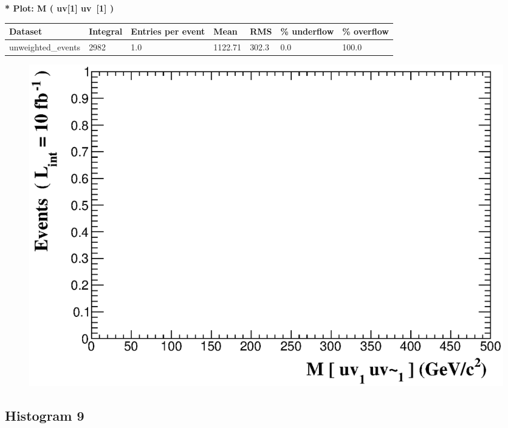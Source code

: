 \documentclass[a4paper, 10pt]{article}
\begin{document}
\textbf{* Plot: M ( uv[1] uv~[1] ) }\\
   \begin{table}[H]
  \begin{center}
    \begin{tabular}{|m{23.0mm}|m{23.0mm}|m{18.0mm}|m{19.0mm}|m{19.0mm}|m{19.0mm}|m{19.0mm}|}
      \hline
      {\cellcolor{yellow}         Dataset}& {\cellcolor{yellow}         Integral}& {\cellcolor{yellow}         Entries per event}& {\cellcolor{yellow}         Mean}& {\cellcolor{yellow}         RMS}& {\cellcolor{yellow}         \% underflow}& {\cellcolor{yellow}         \% overflow}\\
      \hline
      {\cellcolor{white}         unweighted\_events}& {\cellcolor{white}         2982}& {\cellcolor{white}         1.0}& {\cellcolor{white}         1122.71}& {\cellcolor{white}         302.3}& {\cellcolor{red}         0.0}& {\cellcolor{red}         100.0}\\
\hline
    \end{tabular}
  \end{center}
\end{table}

\begin{figure}[H]
  \begin{center}
    \includegraphics[scale=0.45]{selection_7.eps}\\
\caption{   }
  \end{center}
\end{figure}
      \newpage
\subsection{ Histogram 9}
\end{document}
